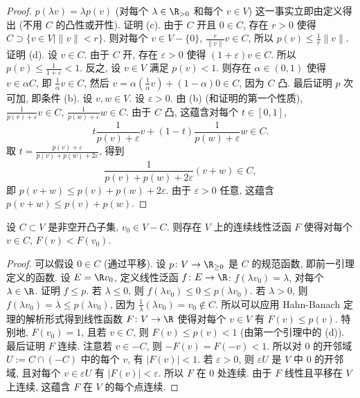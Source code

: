 \begin{proof}
$p(\lambda v) = \lambda p(v)$ (对每个 $\lambda \in \R_{>0}$ 和每个 $v \in V$) 这一事实立即由定义得出 (不用 $C$ 的凸性或开性).
证明 (c). 由于 $C$ 开且 $0 \in C$, 存在 $r > 0$ 使得 $C \supset \{v \in V \mid \|v\| < r\}$. 则对每个 $v \in V - \{0\}$, $\frac{r}{\|v\|}v \in C$, 所以 $p(v) \leq \frac{1}{r}\|v\|$.
证明 (d). 设 $v \in C$. 由于 $C$ 开, 存在 $\varepsilon > 0$ 使得 $(1 + \varepsilon)v \in C$. 所以 $p(v) \leq \frac{1}{1+\varepsilon} < 1$. 反之, 设 $v \in V$ 满足 $p(v) < 1$. 则存在 $\alpha \in (0, 1)$ 使得 $v \in \alpha C$, 即 $\frac{1}{\alpha}v \in C$, 然后 $v = \alpha(\frac{1}{\alpha}v) + (1 - \alpha)0 \in C$, 因为 $C$ 凸.
最后证明 $p$ 次可加, 即条件 (b). 设 $v, w \in V$. 设 $\varepsilon > 0$. 由 (b) (和证明的第一个性质), $\frac{1}{p(v)+\varepsilon}v \in C$, $\frac{1}{p(w)+\varepsilon}w \in C$. 由于 $C$ 凸, 这蕴含对每个 $t \in [0, 1]$,
\[
t\frac{1}{p(v)+\varepsilon}v + (1 - t)\frac{1}{p(w)+\varepsilon}w \in C.
\]
取 $t = \frac{p(v)+\varepsilon}{p(v)+p(w)+2\varepsilon}$, 得到
\[
\frac{1}{p(v) + p(w) + 2\varepsilon}(v + w) \in C,
\]
即 $p(v + w) \leq p(v) + p(w) + 2\varepsilon$. 由于 $\varepsilon > 0$ 任意, 这蕴含 $p(v + w) \leq p(v) + p(w)$.
\end{proof}

\begin{lemma}[凸集与线性泛函]
\label{lem:B.3.9}
设 $C \subset V$ 是非空开凸子集, $v_0 \in V - C$.
则存在 $V$ 上的连续线性泛函 $F$ 使得对每个 $v \in C$, $F(v) < F(v_0)$.
\end{lemma}

\begin{proof}
可以假设 $0 \in C$ (通过平移). 设 $p \colon V \to \R_{\geq 0}$ 是 $C$ 的规范函数, 即前一引理定义的函数.
设 $E = \R v_0$, 定义线性泛函 $f \colon E \to \R$: $f(\lambda v_0) = \lambda$, 对每个 $\lambda \in \R$. 证明 $f \leq p$. 若 $\lambda \leq 0$, 则 $f(\lambda v_0) \leq 0 \leq p(\lambda v_0)$. 若 $\lambda > 0$, 则 $f(\lambda v_0) = \lambda \leq p(\lambda v_0)$, 因为 $\frac{1}{\lambda}(\lambda v_0) = v_0 \notin C$.
所以可以应用 Hahn-Banach 定理的解析形式得到线性函数 $F \colon V \to \R$ 使得对每个 $v \in V$ 有 $F(v) \leq p(v)$. 特别地, $F(v_0) = 1$, 且若 $v \in C$, 则 $F(v) \leq p(v) < 1$ (由第一个引理中的 (d)).
最后证明 $F$ 连续. 注意若 $v \in -C$, 则 $-F(v) = F(-v) < 1$. 所以对 $0$ 的开邻域 $U := C \cap (-C)$ 中的每个 $v$, 有 $|F(v)| < 1$. 若 $\varepsilon > 0$, 则 $\varepsilon U$ 是 $V$ 中 $0$ 的开邻域, 且对每个 $v \in \varepsilon U$ 有 $|F(v)| < \varepsilon$. 所以 $F$ 在 $0$ 处连续. 由于 $F$ 线性且平移在 $V$ 上连续, 这蕴含 $F$ 在 $V$ 的每个点连续.
\end{proof}

